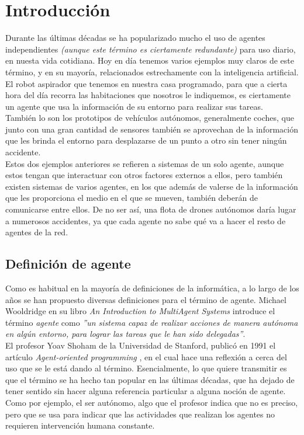 \chapter{Introducción}
\label{chap:introduccion}

Durante las últimas décadas se ha popularizado mucho el uso de agentes independientes \textit{(aunque este término es ciertamente redundante)} para uso diario, en nuesta vida cotidiana. Hoy en día tenemos varios ejemplos muy claros de este término, y en su mayoría, relacionados estrechamente con la inteligencia artificial.\\

El robot aspirador que tenemos en nuestra casa programado, para que a cierta hora del día recorra las habitaciones que nosotros le indiquemos, es ciertamente un agente que usa la información de su entorno para realizar sus tareas.\\

También lo son los prototipos de vehículos autónomos, generalmente coches, que junto con una gran cantidad de sensores también se aprovechan de la información que les brinda el entorno para desplazarse de un punto a otro sin tener ningún accidente.\\

Estos dos ejemplos anteriores se refieren a sistemas de un solo agente, aunque estos tengan que interactuar con otros factores externos a ellos, pero también existen sistemas de varios agentes, en los que además de valerse de la información que les proporciona el medio en el que se mueven, también deberán de comunicarse entre ellos. De no ser así, una flota de drones autónomos daría lugar a numerosos accidentes, ya que cada agente no sabe qué va a hacer el resto de agentes de la red.

\section{Definición de agente}

Como es habitual en la mayoría de definiciones de la informática, a lo largo de los años se han propuesto diversas definiciones para el término de agente. Michael Wooldridge en su libro \textit{An Introduction to MultiAgent Systems} \cite{wooldridge-2009} introduce el término \textit{agente} como \textit{''un sistema capaz de realizar acciones de manera autónoma en algún entorno, para lograr las tareas que le han sido delegadas''}.\\

El profesor Yoav Shoham de la Universidad de Stanford, publicó en 1991 el artículo \textit{Agent-oriented programming} \cite{Shoham}, en el cual hace una reflexión a cerca del uso que se le está dando al término. Esencialmente, lo que quiere transmitir es que el término se ha hecho tan popular en las últimas décadas, que ha dejado de tener sentido sin hacer alguna referencia particular a alguna noción de agente. Como por ejemplo, el ser autónomo, algo que el profesor indica que no es preciso, pero que se usa para indicar que las actividades que realizan los agentes no requieren intervención humana constante.\\

